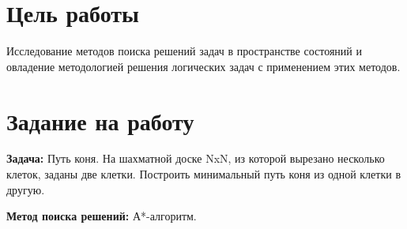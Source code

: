 \documentclass[a4paper,14pt]{extarticle}
\begin{document}


\section{Цель работы}
Исследование методов поиска решений задач в пространстве состояний и овладение
методологией решения логических задач с применением этих методов.

\section{Задание на работу}
\textbf{Задача:} Путь коня. На шахматной доске NxN, из которой вырезано
несколько клеток, заданы две клетки. Построить минимальный путь коня из одной
клетки в другую.

\textbf{Метод поиска решений:} А*-алгоритм.
\end{document}
